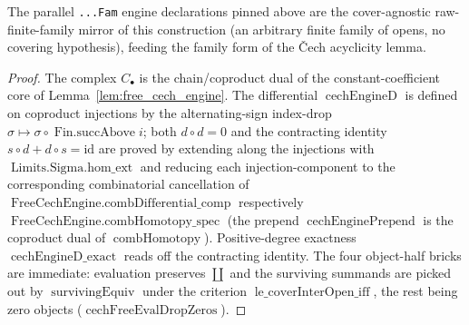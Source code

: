 \begin{lemma}
  The parallel \texttt{...Fam} engine declarations pinned above are the cover-agnostic
  raw-finite-family mirror of this construction (an arbitrary finite family of opens,
  no covering hypothesis), feeding the family form of the {\v C}ech acyclicity lemma.
\end{lemma}

\begin{proof}
  The complex \(C_\bullet\) is the chain/coproduct dual of the constant-coefficient
  core of Lemma~\ref{lem:free_cech_engine}. The differential
  \(\operatorname{cechEngineD}\) is defined on coproduct injections by the
  alternating-sign index-drop \(\sigma \mapsto \sigma \circ \operatorname{Fin.succAbove}
  i\); both \(d \circ d = 0\) and the contracting identity
  \(s \circ d + d \circ s = \mathrm{id}\) are proved by extending along the
  injections with \(\operatorname{Limits.Sigma.hom\_ext}\) and reducing each
  injection-component to the corresponding combinatorial cancellation of
  \(\operatorname{FreeCechEngine.combDifferential\_comp}\) respectively
  \(\operatorname{FreeCechEngine.combHomotopy\_spec}\) (the prepend
  \(\operatorname{cechEnginePrepend}\) is the coproduct dual of
  \(\operatorname{combHomotopy}\)). Positive-degree exactness
  \(\operatorname{cechEngineD\_exact}\) reads off the contracting identity. The four
  object-half bricks are immediate: evaluation preserves \(\coprod\) and the surviving
  summands are picked out by \(\operatorname{survivingEquiv}\) under the criterion
  \(\operatorname{le\_coverInterOpen\_iff}\), the rest being zero objects
  (\(\operatorname{cechFreeEvalDropZeros}\)).
\end{proof}


